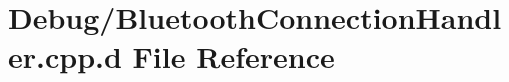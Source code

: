 \hypertarget{_debug_2_bluetooth_connection_handler_8cpp_8d}{\section{\-Debug/\-Bluetooth\-Connection\-Handler.cpp.\-d \-File \-Reference}
\label{_debug_2_bluetooth_connection_handler_8cpp_8d}
}
